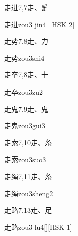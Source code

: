 \begin{entry}{走进}{7,7}{⾛、⾡}
  \begin{phonetics}{走进}{zou3 jin4}[][HSK 2]
  \end{phonetics}
\end{entry}

\begin{entry}{走势}{7,8}{⾛、⼒}
  \begin{phonetics}{走势}{zou3shi4}
  \end{phonetics}
\end{entry}

\begin{entry}{走卒}{7,8}{⾛、⼗}
  \begin{phonetics}{走卒}{zou3zu2}
  \end{phonetics}
\end{entry}

\begin{entry}{走鬼}{7,9}{⾛、⿁}
  \begin{phonetics}{走鬼}{zou3gui3}
  \end{phonetics}
\end{entry}

\begin{entry}{走索}{7,10}{⾛、⽷}
  \begin{phonetics}{走索}{zou3suo3}
  \end{phonetics}
\end{entry}

\begin{entry}{走绳}{7,11}{⾛、⽷}
  \begin{phonetics}{走绳}{zou3sheng2}
  \end{phonetics}
\end{entry}

\begin{entry}{走路}{7,13}{⾛、⾜}
  \begin{phonetics}{走路}{zou3 lu4}[][HSK 1]
  \end{phonetics}
\end{entry}

